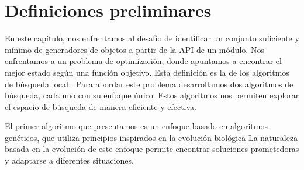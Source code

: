   





\section{Definiciones preliminares}
\label{sec:preliminares}


En este capítulo, nos enfrentamos al desafío de identificar un conjunto suficiente y mínimo de generadores de objetos a partir de la API de un módulo. Nos enfrentamos a un problema de optimización, donde apuntamos a encontrar el mejor estado según una función objetivo. Esta definición es la de los algoritmos de búsqueda local \cite{Russell:2009}. Para abordar este problema desarrollamos dos algoritmos de búsqueda, cada uno con su enfoque único. Estos algoritmos nos permiten explorar el espacio de búsqueda de manera eficiente y efectiva.

El primer algoritmo que presentamos es un enfoque basado en algoritmos genéticos, que utiliza principios inspirados en la evolución biológica \cite{}
La naturaleza basada en la evolución de este enfoque permite encontrar soluciones prometedoras y adaptarse a diferentes situaciones.

